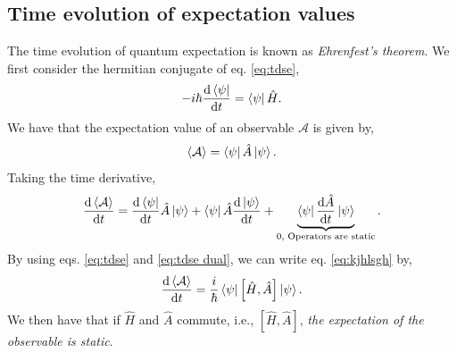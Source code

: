 \documentclass{book}
\begin{document}
\subsection{Time evolution of expectation values}
The time evolution of quantum expectation is known as \textit{Ehrenfest's theorem}. We first consider the hermitian conjugate of eq. \eqref{eq:tdse},
\begin{equation}
	-i\hbar \dv{\bra{\psi}}{t} = \bra{\psi}\hat{H}. \label{eq:tdse dual}
\end{equation}
We have that the expectation value of an observable $\mathcal{A}$ is given by,
\begin{equation}
	\left<\mathcal{A}\right> = \bra{\psi}\hat{A}\ket{\psi}.
\end{equation}
Taking the time derivative,
\begin{equation}
	\dv{\left<\mathcal{A}\right>}{t} = \dv{\bra{\psi}}{t}\hat{A}\ket{\psi} + \bra{\psi}\hat{A}\dv{\ket{\psi}}{t} + \underbrace{\bra{\psi}\dv{\hat{A}}{t}\ket{\psi}}_{0 \text{, Operators are static}}. \label{eq:kjhlsgh}
\end{equation}
By using eqs. \eqref{eq:tdse} and \eqref{eq:tdse dual}, we can write eq. \eqref{eq:kjhlsgh} by,
\begin{equation}
	\dv{\left<\mathcal{A}\right>}{t} = \frac{i}{\hbar}\bra{\psi}\left[\hat{H},\hat{A}\right]\ket{\psi}.
\end{equation}
We then have that if $\hat{H}$ and $\hat{A}$ commute, i.e., $\left[\hat{H},\hat{A}\right]$, \textit{the expectation of the observable is static}.
\end{document}
